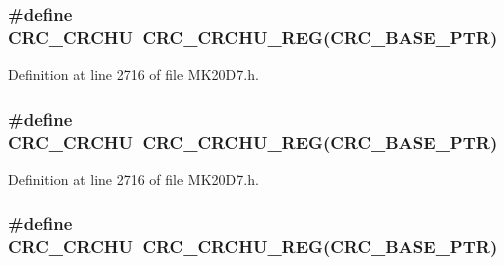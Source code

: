 \subsubsection[{\texorpdfstring{C\+R\+C\+\_\+\+C\+R\+C\+HU}{CRC_CRCHU}}]{\setlength{\rightskip}{0pt plus 5cm}\#define C\+R\+C\+\_\+\+C\+R\+C\+HU~{\bf C\+R\+C\+\_\+\+C\+R\+C\+H\+U\+\_\+\+R\+EG}({\bf C\+R\+C\+\_\+\+B\+A\+S\+E\+\_\+\+P\+TR})}\hypertarget{group___c_r_c___register___accessor___macros_ga1bb4a9c65cb1d816f835f793774cb68d}{}\label{group___c_r_c___register___accessor___macros_ga1bb4a9c65cb1d816f835f793774cb68d}


Definition at line 2716 of file M\+K20\+D7.\+h.

\subsubsection[{\texorpdfstring{C\+R\+C\+\_\+\+C\+R\+C\+HU}{CRC_CRCHU}}]{\setlength{\rightskip}{0pt plus 5cm}\#define C\+R\+C\+\_\+\+C\+R\+C\+HU~{\bf C\+R\+C\+\_\+\+C\+R\+C\+H\+U\+\_\+\+R\+EG}({\bf C\+R\+C\+\_\+\+B\+A\+S\+E\+\_\+\+P\+TR})}\hypertarget{group___c_r_c___register___accessor___macros_ga1bb4a9c65cb1d816f835f793774cb68d}{}\label{group___c_r_c___register___accessor___macros_ga1bb4a9c65cb1d816f835f793774cb68d}


Definition at line 2716 of file M\+K20\+D7.\+h.

\subsubsection[{\texorpdfstring{C\+R\+C\+\_\+\+C\+R\+C\+HU}{CRC_CRCHU}}]{\setlength{\rightskip}{0pt plus 5cm}\#define C\+R\+C\+\_\+\+C\+R\+C\+HU~{\bf C\+R\+C\+\_\+\+C\+R\+C\+H\+U\+\_\+\+R\+EG}({\bf C\+R\+C\+\_\+\+B\+A\+S\+E\+\_\+\+P\+TR})}\hypertarget{group___c_r_c___register___accessor___macros_ga1bb4a9c65cb1d816f835f793774cb68d}{}\label{group___c_r_c___register___accessor___macros_ga1bb4a9c65cb1d816f835f793774cb68d}


